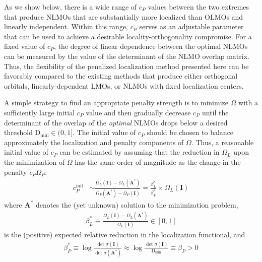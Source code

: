 \documentclass[aps,prl,reprint,amsmath,amssymb]{revtex4-1}
\begin{document}
As we show below, there is a wide range of $c_P$ values between the two extremes that produce NLMOs that are substantially more localized than OLMOs and linearly independent.  
Within this range, $c_P$ serves as an adjustable parameter that can be used to achieve a desirable locality-orthogonality compromise. 
For a fixed value of $c_P$, the degree of linear dependence between the optimal NLMOs can be measured by the value of the determinant of the NLMO overlap matrix. 
Thus, the flexibility of the penalized localization method presented here can be favorably compared to the existing methods that produce either orthogonal orbitals, linearly-dependent LMOs, or NLMOs with fixed localization centers. 

A simple strategy to find an appropriate penalty strength is to minimize $\Omega$ with a sufficiently large initial $c_P$ value and then gradually decrease $c_P$ until the determinant of the overlap of the \emph{optimal} NLMOs drops below a desired threshold $\text{D}_{\text{min}} \in (0,1]$. 
The initial value of $c_P$ should be chosen to balance approximately the localization and penalty components of $\Omega$. 
Thus, a reasonable initial value of $c_P$ can be estimated by assuming that the reduction in $\Omega_L$ upon the minimization of $\Omega$ has the same order of magnitude as the change in the penalty $c_P \Omega_P$:
%
\begin{equation} \label{eq:cp-beta}
\begin{split} 
c_P^{\text{init}} & \sim \frac{ \Omega_{L}(\mathbf{I}) - \Omega_{L}(\mathbf{A}^{\ast}) }{ \Omega_{P}(\mathbf{A}^{\ast}) - \Omega_{P}(\mathbf{I}) } = \frac{ \beta_L^{\ast} }{ \beta_P^{\ast} } \times \Omega_{L}(\mathbf{I})
\end{split}
\end{equation}
%
where $\mathbf{A}^{\ast}$ denotes the (yet unknown) solution to the minimization problem, 
%
\begin{equation} 
\begin{split} 
\beta_L^{\ast} \equiv \frac{\Omega_L(\mathbf{I})- \Omega_L(\mathbf{A}^{\ast})}{\Omega_L(\mathbf{I})} \in [0,1]
\end{split}
\end{equation}
%
is the (positive) expected relative reduction in the localization functional, and 
%
\begin{equation} \label{eq:betap}
\begin{split} 
\beta_P^{\ast} \equiv \log \frac{\det \sigma(\mathbf{I})}{ \det \sigma(\mathbf{A}^{\ast}) } \approx \log \frac{\det \sigma(\mathbf{I})}{ \text{D}_{\text{min}} } \equiv \beta_P > 0
\end{split}
\end{equation}
\end{document}
